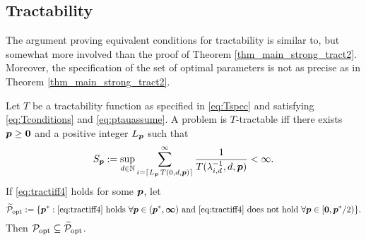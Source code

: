 \documentclass[11pt,a4paper]{article}
\begin{document}
\subsection{Tractability} \label{sec:tractability}


The argument proving equivalent conditions for tractability is similar to, but somewhat more involved than the proof of Theorem \ref{thm_main_strong_tract2}.  Moreover, the specification of the set of optimal parameters is not as precise as in Theorem \ref{thm_main_strong_tract2}.

\begin{theorem}\label{thm_main_tract2}
Let $T$ be a tractability function as specified in \eqref{eq:Tspec} and satisfying \eqref{eq:Tconditions} and \eqref{eq:ptauassume}.  A problem is $T$-tractable iff there exists $\boldsymbol{p}\ge \boldsymbol{0}$ and a positive integer $L_{\boldsymbol{p}}$ such that
\begin{equation} \label{eq:tractiff4}
     S_{\boldsymbol{p}}:=\sup_{d \in \mathbb{N}}
     \sum_{i = \lceil L_{\boldsymbol{p}}\, T(0,d,\boldsymbol{p}) \rceil}^\infty \frac{1}{T(\lambda^{-1}_{i,d},d,\boldsymbol{p})}< \infty.
\end{equation}
If \eqref{eq:tractiff4} holds for some $\boldsymbol{p}$, let
\[
\widetilde{\mathcal{P}}_{\textup{opt}} : = \{\boldsymbol{p}^* : \eqref{eq:tractiff4} \text{ holds }\forall \boldsymbol{p} \in (\boldsymbol{p}^*,\boldsymbol{\infty}) \text{ and }  \eqref{eq:tractiff4} \text{ does not hold } \forall \boldsymbol{p} \in [\boldsymbol{0},\boldsymbol{p}^*/2)\}.
\]
Then $\mathcal{P}_{\textup{opt}} \subseteq \widetilde{\mathcal{P}}_{\textup{opt}}$.


\end{theorem}
\end{document}
